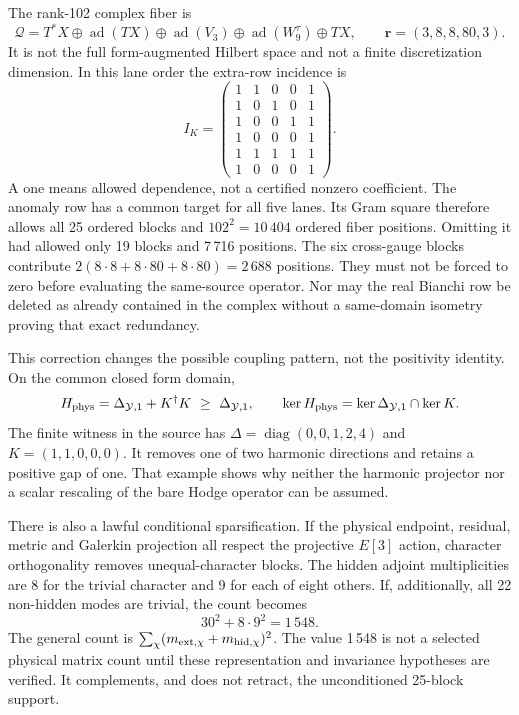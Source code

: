 \documentclass[11pt,a4paper]{article}
\newcommand{\ad}{\operatorname{ad}}
\begin{document}
The rank-102 complex fiber is
\[
\mathcal Q=T^*X\oplus\ad(TX)\oplus\ad(V_3)
              \oplus\ad(W_9^\tau)\oplus TX,\qquad
\mathbf r=(3,8,8,80,3).
\]
It is not the full form-augmented Hilbert space and not a finite
discretization dimension. In this lane order the extra-row incidence is
\[
I_K=\begin{pmatrix}
1&1&0&0&1\\
1&0&1&0&1\\
1&0&0&1&1\\
1&0&0&0&1\\
1&1&1&1&1\\
1&0&0&0&1
\end{pmatrix}.
\]
A one means allowed dependence, not a certified nonzero coefficient.
The anomaly row has a common target for all five lanes. Its Gram square
therefore allows all 25 ordered blocks and \(102^2=10\,404\) ordered
fiber positions. Omitting it had allowed only 19 blocks and 7\,716
positions. The six cross-gauge blocks contribute
\(2(8\cdot8+8\cdot80+8\cdot80)=2\,688\) positions.
They must not be forced to zero before evaluating the same-source
operator. Nor may the real Bianchi row be deleted as already contained in
the complex without a same-domain isometry proving that exact redundancy.

This correction changes the possible coupling pattern, not the
positivity identity. On the common closed form domain,
\[
H_{\rm phys}=\Delta_{\mathcal Y,1}+K^\dagger K
 \ \geq\ \Delta_{\mathcal Y,1},\qquad
\ker H_{\rm phys}=\ker\Delta_{\mathcal Y,1}\cap\ker K .
\]
The finite witness in the source has
\(\Delta=\operatorname{diag}(0,0,1,2,4)\) and \(K=(1,1,0,0,0)\).
It removes one of two harmonic directions and retains a positive gap
of one. That example shows why neither the harmonic projector nor
a scalar rescaling of the bare Hodge operator can be assumed.

There is also a lawful conditional sparsification. If the physical
endpoint, residual, metric and Galerkin projection all respect the
projective \(E[3]\) action, character orthogonality removes unequal-character
blocks. The hidden adjoint multiplicities are 8 for the trivial
character and 9 for each of eight others. If, additionally, all 22
non-hidden modes are trivial, the count becomes
\[
30^2+8\cdot9^2=1\,548 .
\]
The general count is
\(\sum_\chi(m_{{\rm ext},\chi}+m_{{\rm hid},\chi})^2\).
The value 1\,548 is not a selected physical matrix count until these
representation and invariance hypotheses are verified. It complements,
and does not retract, the unconditioned 25-block support.
\end{document}
